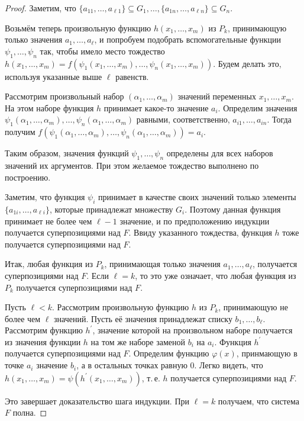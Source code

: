 \begin{proof}
    Заметим, что $\{a_{11}, \ldots, a_{\ell 1}\} \subseteq G_1, \ldots, \{a_{1n}, \ldots, a_{\ell n}\} \subseteq G_n$.

    Возьмём теперь произвольную функцию $h(x_1, \ldots, x_m)$ из $P_k$, принимающую только значения $a_1, \ldots, a_\ell$, и попробуем подобрать вспомогательные функции $\psi_1, \ldots, \psi_n$ так, чтобы имело место тождество $h(x_1, \ldots, x_m) = f(\psi_1(x_1, \ldots, x_m), \ldots, \psi_n(x_1, \ldots, x_m))$. Будем делать это, используя указанные выше $\ell$ равенств.

    Рассмотрим произвольный набор $(\alpha_1, \ldots, \alpha_m)$ значений переменных $x_1, \ldots, x_m$. На этом наборе функция $h$ принимает какое-то значение $a_i$. Определим значения $\psi_1(\alpha_1, \ldots, \alpha_m), \ldots, \psi_n(\alpha_1, \ldots, \alpha_m)$ равными, соответственно, $a_{i1}, \ldots, a_{in}$. Тогда получим $f(\psi_1(\alpha_1, \ldots, \alpha_m), \ldots, \psi_n(\alpha_1, \ldots, \alpha_m)) = a_i$.

    Таким образом, значения функций $\psi_1, \ldots, \psi_n$ определены для всех наборов значений их аргументов. При этом желаемое тождество выполнено по построению.

    Заметим, что функция $\psi_i$ принимает в качестве своих значений только элементы $\{a_{1i}, \ldots, a_{\ell i}\}$, которые принадлежат множеству $G_i$. Поэтому данная функция принимает не более чем $\ell - 1$ значение, и по предположению индукции получается суперпозициями над $F$. Ввиду указанного тождества, функция $h$ тоже получается суперпозициями над $F$.

    Итак, любая функция из $P_k$, принимающая только значения $a_1, \ldots, a_\ell$, получается суперпозициями над $F$. Если $\ell = k$, то это уже означает, что любая функция из $P_k$ получается суперпозициями над $F$.

    Пусть $\ell < k$. Рассмотрим произвольную функцию $h$ из $P_k$, принимающую не более чем $\ell$ значений. Пусть её значения принадлежат списку $b_1, \ldots, b_\ell$. Рассмотрим функцию $h^\prime$, значение которой на произвольном наборе получается из значения функции $h$ на том же наборе заменой $b_i$ на $a_i$. Функция $h^\prime$ получается суперпозициями над $F$. Определим функцию $\varphi(x)$, принмающую в точке $a_i$ значение $b_i$, а в остальных точках равную $0$. Легко видеть, что $h(x_1, \ldots, x_m) = \psi(h^\prime(x_1, \ldots, x_m))$, т.\,е. $h$ получается суперпозициями над $F$.

    Это завершает доказательство шага индукции. При $\ell = k$ получаем, что система $F$ полна.
\end{proof}

